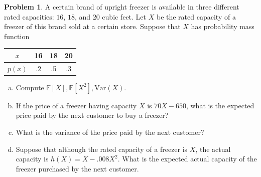\documentclass[10pt]{article}
\theoremstyle{definition}
\newtheorem{problem}[theorem]{Problem}
\newcommand{\1}[1]{\textbf{1}_{\left[#1\right]}} %
\def\E{\mathbb{E}} %
\def\Var{\mathrm{Var}} %
\begin{document}
\begin{problem}
  A certain brand of upright freezer is available in three different rated
  capacities: $16$,  $18$, and $20$ cubic feet. Let $X$ be the rated capacity
  of a freezer of this brand sold at a certain store. Suppose that $X$ has
  probability mass function
  \begin{center}
    \begin{tabular}[c]{c|ccc}
      $x$&16&18&20\\ 
      \hline
      $p(x)$&.2&.5&.3 
    \end{tabular}
  \end{center}
  \begin{enumerate}[(a)]
    \item Compute $\E\left[X \right], \E\left[X^{2} \right], \Var(X)$.
    \item If the price of a freezer having capacity $X$ is $70X-650$, what is
    the expected price paid by the next customer to buy a freezer?
    \item What is the variance of the price paid by the next customer?
    \item Suppose that although the rated capacity of a freezer is $X$, the
    actual capacity is $h(X)=X-.008X^{2}$. What is the expected actual
    capacity of the freezer purchased by the next customer.
  \end{enumerate}
\end{problem}


\end{document}
